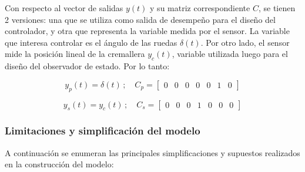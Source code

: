 \documentclass{article}
\begin{document}
Con respecto al vector de salidas $y(t)$ y su matriz correspondiente $C$, se tienen 2 versiones: una que se utiliza como salida de desempeño para el diseño del controlador, y otra que representa la variable medida por el sensor. La variable que interesa controlar es el ángulo de las ruedas $\delta(t)$. Por otro lado, el sensor mide la posición lineal de la cremallera $y_c(t)$, variable utilizada luego para el diseño del observador de estado. Por lo tanto:

\begin{equation}
y_p(t) = \delta(t) \, ; \quad C_p =
\begin{bmatrix}
0 & 0 & 0 & 0 & 0 & 1 & 0
\end{bmatrix}
\label{eq:salida_performance}
\end{equation}

\begin{equation}
y_s(t) = y_c(t)  \, ; \quad C_s =
\begin{bmatrix}
0 & 0 & 0 & 1 & 0 & 0 & 0
\end{bmatrix}
\end{equation}

\subsubsection{Limitaciones y simplificación del modelo}

A continuación se enumeran las principales simplificaciones y supuestos realizados en la construcción del modelo:
\end{document}
